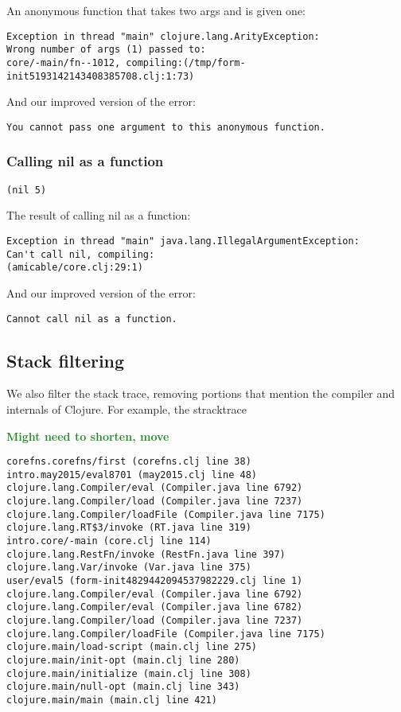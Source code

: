 \documentclass[submission,copyright,creativecommons]{eptcs}
\newcommand{\allcomments}[1]{{#1}}
\newcommand{\emcomment}[1]{{\bf \textcolor{ForestGreen}{\allcomments{{#1}}}}}
\begin{document}
An anonymous function that takes two args and is given one:
\begin{verbatim}
Exception in thread "main" clojure.lang.ArityException:
Wrong number of args (1) passed to: 
core/-main/fn--1012, compiling:(/tmp/form-init5193142143408385708.clj:1:73)
\end{verbatim}
And our improved version of the error:
\begin{verbatim}
You cannot pass one argument to this anonymous function.
\end{verbatim}

\subsubsection{Calling nil as a function}
{\tt (nil 5)}

The result of calling nil as a function:
\begin{verbatim}
Exception in thread "main" java.lang.IllegalArgumentException:
Can't call nil, compiling:
(amicable/core.clj:29:1)
\end{verbatim}
And our improved version of the error:
\begin{verbatim}
Cannot call nil as a function.
\end{verbatim}

\subsection{Stack filtering}
We also filter the stack trace, removing portions that mention the compiler and internals of Clojure. For example, the stracktrace 

\emcomment{Might need to shorten, move}

\begin{verbatim}
corefns.corefns/first (corefns.clj line 38)
intro.may2015/eval8701 (may2015.clj line 48)
clojure.lang.Compiler/eval (Compiler.java line 6792)
clojure.lang.Compiler/load (Compiler.java line 7237)
clojure.lang.Compiler/loadFile (Compiler.java line 7175)
clojure.lang.RT$3/invoke (RT.java line 319)
intro.core/-main (core.clj line 114)
clojure.lang.RestFn/invoke (RestFn.java line 397)
clojure.lang.Var/invoke (Var.java line 375)
user/eval5 (form-init4829442094537982229.clj line 1)
clojure.lang.Compiler/eval (Compiler.java line 6792)
clojure.lang.Compiler/eval (Compiler.java line 6782)
clojure.lang.Compiler/load (Compiler.java line 7237)
clojure.lang.Compiler/loadFile (Compiler.java line 7175)
clojure.main/load-script (main.clj line 275)
clojure.main/init-opt (main.clj line 280)
clojure.main/initialize (main.clj line 308)
clojure.main/null-opt (main.clj line 343)
clojure.main/main (main.clj line 421)
\end{verbatim}
 
\end{document}
